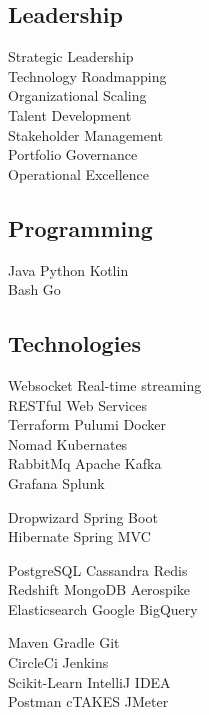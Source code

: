 \documentclass[]{rajnikant-resume-openfont}
\begin{document}
\begin{minipage}[t]{0.33\textwidth}
\subsection{Leadership}
Strategic Leadership \\
Technology Roadmapping \\
Organizational Scaling \\
Talent Development \\
Stakeholder Management \\
Portfolio Governance \\
Operational Excellence \\
\sectionsep

\subsection{Programming}
Java \textbullet{}  Python \textbullet{} Kotlin \\ 
Bash \textbullet{} Go 
\sectionsep

\subsection{Technologies}
 Websocket  \textbullet{} Real-time streaming \\
  RESTful Web Services \\
 Terraform  \textbullet{} Pulumi \textbullet{}   Docker  \\
 Nomad  \textbullet{} Kubernates  \\
 RabbitMq \textbullet{} Apache Kafka \\
 Grafana \textbullet{} Splunk 
 \sectionsep
 
  Dropwizard \textbullet{} Spring Boot \\ 
 Hibernate \textbullet{} Spring MVC  
\sectionsep

 PostgreSQL \textbullet{} Cassandra \textbullet{} Redis \\
  Redshift \textbullet{} MongoDB \textbullet{} Aerospike \\
   Elasticsearch \textbullet{} Google BigQuery
 \sectionsep
 
 \sectionsep
 
  \sectionsep
 
      Maven \textbullet{}  Gradle  \textbullet{} Git \\
      CircleCi \textbullet{} Jenkins \\
      Scikit-Learn  \textbullet{} IntelliJ IDEA \\
      Postman \textbullet{} cTAKES \textbullet{} JMeter 
\sectionsep




%
%

\end{minipage} 
\end{document}
